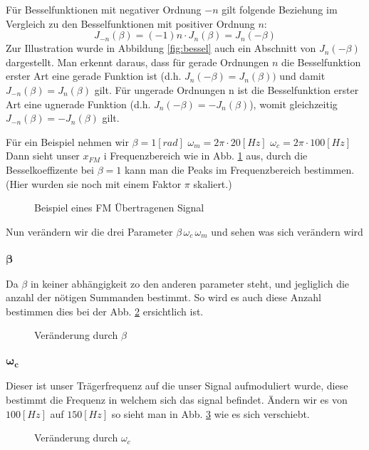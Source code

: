 Für Besselfunktionen mit negativer Ordnung \(-n\) gilt folgende Beziehung im Vergleich zu den Besselfunktionen mit positiver Ordnung \(n\):
\[
    J_{-n} (\beta) = (-1) n \cdot J_n (\beta) = J_n (-\beta)
    \label{fm:eq:besselid:gerad:ungerade}
\]
Zur Illustration wurde in Abbildung \ref{fig:bessel} auch ein Abschnitt von \(J_n (-\beta)\) dargestellt.
Man erkennt daraus, dass für gerade Ordnungen \(n\) die Besselfunktion erster Art eine gerade Funktion ist 
(d.h. \(J_n (-\beta) = J_n (\beta))\) und damit \(J_{-n} (\beta) = J_n (\beta)\) gilt.
Für ungerade Ordnungen n ist die Besselfunktion erster Art eine ugnerade Funktion 
(d.h. \(J_n (-\beta) = -J_n (\beta)\)), womit gleichzeitig \(J_{-n} (\beta) = -J_n (\beta)\) gilt.

Für ein Beispiel nehmen wir  \(\beta = 1 [rad]\,\,\omega_m = 2 \pi \cdot 20 [Hz] \,\, \omega_c =  2 \pi \cdot 100 [Hz] \)
Dann sieht unser \(x_{FM}\) i Frequenzbereich wie in Abb. \ref{fig:fm:bessel_fm} aus, durch die Besselkoeffizente bei \(\beta = 1\) kann man die Peaks im Frequenzbereich bestimmen.
(Hier wurden sie noch mit einem Faktor \(\pi\) skaliert.)
\begin{figure}
	\centering
	
	\caption{Beispiel eines FM Übertragenen Signal}
	\label{fig:fm:bessel_fm}
\end{figure}
Nun verändern wir die drei Parameter \(\beta \,\omega_c \,\omega_m \) und sehen was sich verändern wird

\subsubsection{$\bm{\beta}$}
Da \(\beta\) in keiner abhängigkeit zo den anderen parameter steht, und jegliglich die anzahl der nötigen Summanden bestimmt.
So wird es auch diese Anzahl bestimmen dies bei der Abb. \ref{fig:fm:beta_fm} ersichtlich ist.
\begin{figure}[h]
	\centering
	
	\caption{Veränderung durch \(\beta\)}
	\label{fig:fm:beta_fm}
\end{figure}

\subsubsection{$\bm{\omega_c}$}
Dieser ist unser Trägerfrequenz auf die unser Signal aufmoduliert wurde, diese bestimmt die Frequenz in welchem sich das signal befindet. 
Ändern wir es von \( 100 [Hz] \) auf \(150 [Hz]\) so sieht man in Abb. \ref{fig:fm:fc_150} wie es sich verschiebt.
\begin{figure}[h]
	\centering
	
	\caption{Veränderung durch \(\omega_c\)}
	\label{fig:fm:fc_150}
\end{figure}

